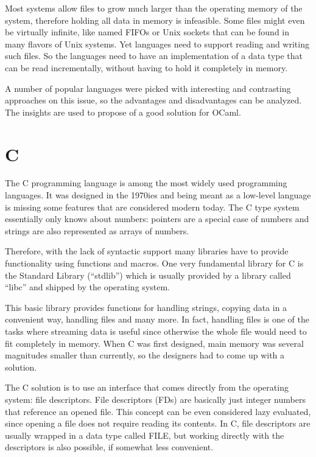 \documentclass[parskip=half]{scrreprt}
\newcommand\inline[1]{{\addfontfeature{Letters=SmallCaps}#1}}
\begin{document}
Most systems allow files to grow much larger than the operating memory of the
system, therefore holding all data in memory is infeasible. Some files might
even be virtually infinite, like named FIFOs or Unix sockets that can be found
in many flavors of Unix systems. Yet languages need to support reading and
writing such files. So the languages need to have an implementation of a data
type that can be read incrementally, without having to hold it completely in
memory.

A number of popular languages were picked with interesting and contrasting
approaches on this issue, so the advantages and disadvantages can be analyzed.
The insights are used to propose of a good solution for OCaml.

\section{C}
\label{sec:c}

The C programming language is among the most widely used programming languages.
It was designed in the 1970ies\cite[p.~1]{kernighan1988c} and being meant as a
low-level language is missing some features that are considered modern today.
The C type system essentially only knows about numbers: pointers are a special
case of numbers and strings are also represented as arrays of numbers.

Therefore, with the lack of syntactic support many libraries have to provide
functionality using functions and macros. One very fundamental library for C is
the Standard Library (\enquote{stdlib}) which is usually provided by a library
called \enquote{libc} and shipped by the operating system.

This basic library provides functions for handling strings, copying data in a
convenient way, handling files and many more. In fact, handling files is one of
the tasks where streaming data is useful since otherwise the whole file would
need to fit completely in memory. When C was first designed, main memory was
several magnitudes smaller than currently, so the designers had to come up with
a solution.

The C solution is to use an interface that comes directly from the operating
system: file descriptors. File descriptors (FDs) are basically just integer
numbers that reference an opened file. This concept can be even considered lazy
evaluated, since opening a file does not require reading its contents. In C,
file descriptors are usually wrapped in a data type called \inline{FILE}, but
working directly with the descriptors is also possible, if somewhat less
convenient.
\end{document}
